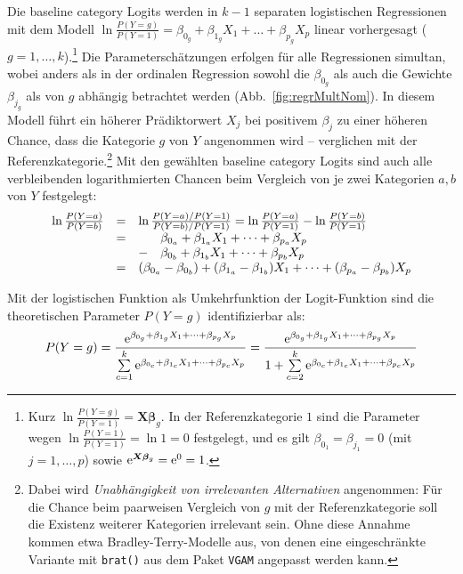 Die baseline category Logits werden in $k-1$ separaten logistischen Regressionen mit dem Modell $\ln \frac{P(Y = g)}{P(Y = 1)} = \beta_{0_{g}} + \beta_{1_{g}} X_{1} + \dots + \beta_{p_{g}} X_{p}$ linear vorhergesagt ($g = 1, \ldots, k$).\footnote{Kurz $\ln \frac{P(Y = g)}{P(Y = 1)} = \bm{X} \bm{\beta}_{g}$. In der Referenzkategorie $1$ sind die Parameter wegen $\ln \frac{P(Y = 1)}{P(Y = 1)} = \ln 1 = 0$ festgelegt, und es gilt $\beta_{0_{1}} = \beta_{j_{1}} = 0$ (mit $j = 1, \ldots, p$) sowie ${\mathrm{e}}^{\bm{X} \bm{\beta}_{g}} = {\mathrm{e}}^{0} = 1$.} Die Parameterschätzungen erfolgen für alle Regressionen simultan, wobei anders als in der ordinalen Regression sowohl die $\beta_{0_{g}}$ als auch die Gewichte $\beta_{j_{g}}$ als von $g$ abhängig betrachtet werden (Abb.\ \ref{fig:regrMultNom}). In diesem Modell führt ein höherer Prädiktorwert $X_{j}$ bei positivem $\beta_{j}$ zu einer höheren Chance, dass die Kategorie $g$ von $Y$ angenommen wird -- verglichen mit der Referenzkategorie.\footnote{Dabei wird \emph{Unabhängigkeit von irrelevanten Alternativen} angenommen: Für die Chance beim paarweisen Vergleich von $g$ mit der Referenzkategorie soll die Existenz weiterer Kategorien irrelevant sein. Ohne diese Annahme kommen etwa Bradley-Terry-Modelle aus, von denen eine eingeschränkte Variante mit  \lstinline!brat()! aus dem Paket \lstinline!VGAM! angepasst werden kann.} Mit den gewählten baseline category Logits sind auch alle verbleibenden logarithmierten Chancen beim Vergleich von je zwei Kategorien $a, b$ von $Y$ festgelegt:
\begin{equation*}
\begin{array}{rccl}
\ln \frac{P(Y = a)}{P(Y = b)} &=& \multicolumn{2}{l}{\ln\frac{P(Y=a) / P(Y=1)}{P(Y=b) / P(Y=1)} = \ln \frac{P(Y=a)}{P(Y=1)} - \ln \frac{P(Y=b)}{P(Y=1)}}\\
~ &=& & \beta_{0_{a}} + \beta_{1_{a}} X_{1} + \dots + \beta_{p_{a}} X_{p}\\
~ & &-& \beta_{0_{b}} + \beta_{1_{b}} X_{1} + \dots + \beta_{p_{b}} X_{p}\\
~ &=& \multicolumn{2}{l}{(\beta_{0_{a}} - \beta_{0_{b}}) + (\beta_{1_{a}} - \beta_{1_{b}}) X_{1} + \dots + (\beta_{p_{a}} - \beta_{p_{b}}) X_{p}}
\end{array}
\end{equation*}

Mit der logistischen Funktion als Umkehrfunktion der Logit-Funktion sind die theoretischen Parameter $P(Y=g)$ identifizierbar als:
\begin{equation*}
P(Y = g) = \frac{{\mathrm{e}}^{\beta_{0_{g}} + \beta_{1_{g}} X_{1} + \dots + \beta_{p_{g}} X_{p}}}{\sum\limits_{c=1}^{k} {\mathrm{e}}^{\beta_{0_{c}} + \beta_{1_{c}} X_{1} + \dots + \beta_{p_{c}} X_{p}}} = \frac{{\mathrm{e}}^{\beta_{0_{g}} + \beta_{1_{g}} X_{1} + \dots + \beta_{p_{g}} X_{p}}}{1 + \sum\limits_{c=2}^{k} {\mathrm{e}}^{\beta_{0_{c}} + \beta_{1_{c}} X_{1} + \dots + \beta_{p_{c}} X_{p}}}
\end{equation*}

